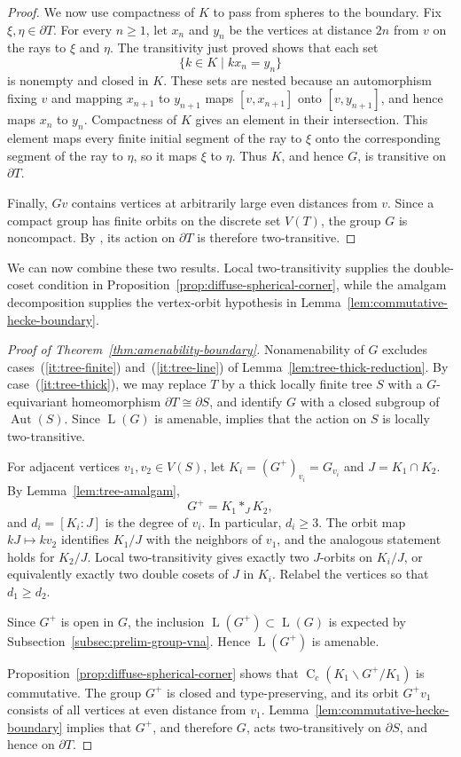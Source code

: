 \documentclass[11pt]{amsart}
\numberwithin{equation}{section}
\DeclareMathOperator{\LL}{L}
\DeclareMathOperator{\Aut}{Aut}
\newcommand{\rC}{\operatorname{C}}
\newcommand{\Hk}[2]{\rC_c(#2\backslash #1/#2)}
\theoremstyle{definition}
\begin{document}
\begin{proof}
    We now use compactness of $K$ to pass from spheres to the boundary. Fix $\xi,\eta\in\partial T$. For every $n\geq1$, let $x_n$ and $y_n$ be the vertices at distance $2n$ from $v$ on the rays to $\xi$ and $\eta$. The transitivity just proved shows that each set
    $$
        \{k\in K\mid kx_n=y_n\}
    $$
    is nonempty and closed in $K$. These sets are nested because an automorphism fixing $v$ and mapping $x_{n+1}$ to $y_{n+1}$ maps $[v,x_{n+1}]$ onto $[v,y_{n+1}]$, and hence maps $x_n$ to $y_n$. Compactness of $K$ gives an element in their intersection. This element maps every finite initial segment of the ray to $\xi$ onto the corresponding segment of the ray to $\eta$, so it maps $\xi$ to $\eta$. Thus $K$, and hence $G$, is transitive on $\partial T$.

    Finally, $Gv$ contains vertices at arbitrarily large even distances from $v$. Since a compact group has finite orbits on the discrete set $V(T)$, the group $G$ is noncompact. By \cite[Lemma~3.1.1]{BM00}, its action on $\partial T$ is therefore two-transitive.
\end{proof}

We can now combine these two results. Local two-transitivity supplies the double-coset condition in Proposition~\ref{prop:diffuse-spherical-corner}, while the amalgam decomposition supplies the vertex-orbit hypothesis in Lemma~\ref{lem:commutative-hecke-boundary}.

\begin{proof}[Proof of Theorem~\ref{thm:amenability-boundary}]
    Nonamenability of $G$ excludes cases~\textup{(\ref*{it:tree-finite})} and~\textup{(\ref*{it:tree-line})} of Lemma~\ref{lem:tree-thick-reduction}. By case~\textup{(\ref*{it:tree-thick})}, we may replace $T$ by a thick locally finite tree $S$ with a $G$-equivariant homeomorphism $\partial T\cong\partial S$, and identify $G$ with a closed subgroup of $\Aut(S)$. Since $\LL(G)$ is amenable, \cite[Theorem~C]{HR19} implies that the action on $S$ is locally two-transitive.

    For adjacent vertices $v_1,v_2\in V(S)$, let $K_i=(G^+)_{v_i}=G_{v_i}$ and $J=K_1\cap K_2$. By Lemma~\ref{lem:tree-amalgam},
    $$
        G^+=K_1\ast_JK_2,
    $$
    and $d_i=[K_i:J]$ is the degree of $v_i$. In particular, $d_i\geq3$. The orbit map $kJ\mapsto kv_2$ identifies $K_1/J$ with the neighbors of $v_1$, and the analogous statement holds for $K_2/J$. Local two-transitivity gives exactly two $J$-orbits on $K_i/J$, or equivalently exactly two double cosets of $J$ in $K_i$. Relabel the vertices so that $d_1\geq d_2$.

    Since $G^+$ is open in $G$, the inclusion $\LL(G^+)\subset\LL(G)$ is expected by Subsection~\ref{subsec:prelim-group-vna}. Hence $\LL(G^+)$ is amenable.

    Proposition~\ref{prop:diffuse-spherical-corner} shows that $\Hk{G^+}{K_1}$ is commutative. The group $G^+$ is closed and type-preserving, and its orbit $G^+v_1$ consists of all vertices at even distance from $v_1$. Lemma~\ref{lem:commutative-hecke-boundary} implies that $G^+$, and therefore $G$, acts two-transitively on $\partial S$, and hence on $\partial T$.
\end{proof}
\end{document}
